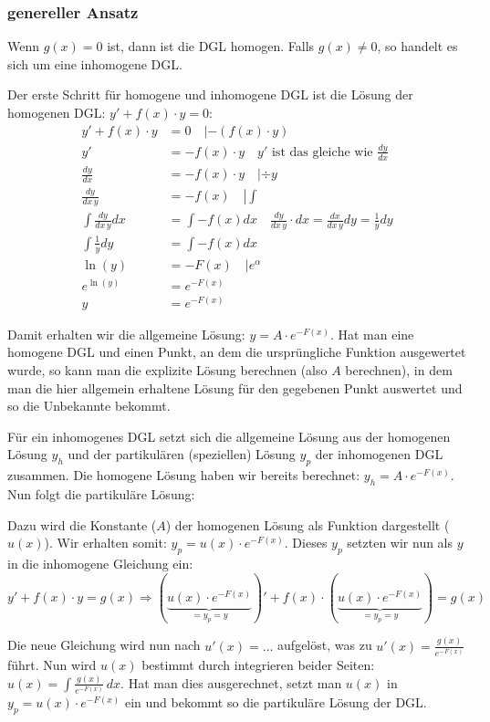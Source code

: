 \subsubsection{genereller Ansatz}
Wenn $g(x) = 0$ ist, dann ist die DGL homogen. Falls $g(x) \neq 0$, so handelt
es sich um eine inhomogene DGL.

Der erste Schritt für homogene und inhomogene DGL ist die Lösung der homogenen
DGL: $y' + f(x) \cdot y = 0$:
{\small
\begin{align*}
y' + f(x) \cdot y &= 0 \quad \left | -(f(x) \cdot y) \right.\\
y' &= -f(x) \cdot y \quad \boxed{y' \text{ ist das gleiche wie } \frac{dy}{dx}}\\
\frac{dy}{dx} &= -f(x) \cdot y \quad \left | \div y \right.\\
\frac{dy}{dx\, y} &= -f(x) \quad \left | \int \right.\\
\int \frac{dy}{dx\, y} dx &= \int -f(x) dx \quad \boxed{\frac{dy}{dx\, y} \cdot dx = \frac{dx}{dx\, y} dy = \frac{1}{y} dy}\\
\int \frac{1}{y} dy &= \int -f(x) dx\\
\ln(y) &= -F(x) \quad \left | e^\alpha \right.\\
e^{\ln(y)} &= e^{-F(x)}\\
y &= e^{-F(x)}
\end{align*}
}

Damit erhalten wir die allgemeine Lösung: $y = A \cdot e^{-F(x)}$. Hat man eine
homogene DGL und einen Punkt, an dem die ursprüngliche Funktion ausgewertet wurde,
so kann man die explizite Lösung berechnen (also $A$ berechnen), in dem man die
hier allgemein erhaltene Lösung für den gegebenen Punkt auswertet und so die
Unbekannte bekommt.

Für ein inhomogenes DGL setzt sich die allgemeine Lösung aus der homogenen Lösung
$y_h$ und der partikulären (speziellen) Lösung $y_p$ der inhomogenen DGL zusammen.
Die homogene Lösung haben wir bereits berechnet: $y_h = A \cdot e^{-F(x)}$. Nun
folgt die partikuläre Lösung:

Dazu wird die Konstante ($A$) der homogenen Lösung als Funktion dargestellt ($u(x)$).
Wir erhalten somit: $y_p = u(x) \cdot e^{-F(x)}$.
Dieses $y_p$ setzten wir nun als $y$ in die inhomogene Gleichung ein:
{\small
\[
y' + f(x) \cdot y = g(x) \Rightarrow (\underbrace{u(x) \cdot e^{-F(x)}}_{= y_p = y})'
+ f(x) \cdot (\underbrace{u(x) \cdot e^{-F(x)}}_{= y_p = y}) = g(x)
\]
}

Die neue Gleichung wird nun nach $u'(x) = \ldots$ aufgelöst, was zu
$u'(x) = \frac{g(x)}{e^{-F(x)}}$ führt. Nun wird $u(x)$ bestimmt durch integrieren
beider Seiten: $u(x) = \int \frac{g(x)}{e^{-F(x)}}\,dx$. Hat man dies ausgerechnet,
setzt man $u(x)$ in $y_p = u(x) \cdot e^{-F(x)}$ ein und bekommt so die partikuläre
Lösung der DGL.

